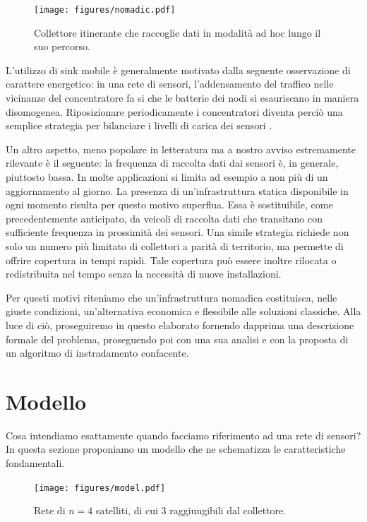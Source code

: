 \documentclass[a4paper,11pt]{article}
\theoremstyle{definition}
\begin{document}
\begin{figure}[H]
\centering
\texttt{[image: figures/nomadic.pdf]}
\caption{Collettore itinerante che raccoglie dati in modalità ad hoc lungo il suo percorso.}
\end{figure}

L'utilizzo di sink mobile è generalmente motivato dalla seguente osservazione di carattere energetico: in una rete di sensori, l'addensamento del traffico nelle vicinanze del concentratore fa si che le batterie dei nodi si esauriscano in maniera disomogenea. Riposizionare periodicamente i concentratori diventa perciò una semplice strategia per bilanciare i livelli di carica dei sensori \cite{moblife1, moblife2}.

Un altro aspetto, meno popolare in letteratura ma a nostro avviso estremamente rilevante è il seguente: la frequenza di raccolta dati dai sensori è, in generale, piuttosto bassa. In molte applicazioni si limita ad esempio a non più di un aggiornamento al giorno. La presenza di un'infrastruttura statica disponibile in ogni momento risulta per questo motivo superflua. Essa è sostituibile, come precedentemente anticipato, da veicoli di raccolta dati che transitano con sufficiente frequenza in prossimità dei sensori. Una simile strategia richiede non solo un numero più limitato di collettori a parità di territorio, ma permette di offrire copertura in tempi rapidi. Tale copertura può essere inoltre rilocata o redistribuita nel tempo senza la necessità di nuove installazioni.

Per questi motivi riteniamo che un'infrastruttura nomadica costituisca, nelle giuste condizioni, un'alternativa economica e flessibile alle soluzioni classiche. Alla luce di ciò, proseguiremo in questo elaborato fornendo dapprima una descrizione formale del problema, proseguendo poi con una sua analisi e con la proposta di un algoritmo di instradamento confacente.

\section{Modello}

Cosa intendiamo esattamente quando facciamo riferimento ad una rete di sensori? In questa sezione proponiamo un modello che ne schematizza le caratteristiche fondamentali.

\begin{figure}[H]
\centering
\texttt{[image: figures/model.pdf]}
\caption{Rete di $n=4$ satelliti, di cui 3 raggiungibili dal collettore.}
\end{figure}
\end{document}
